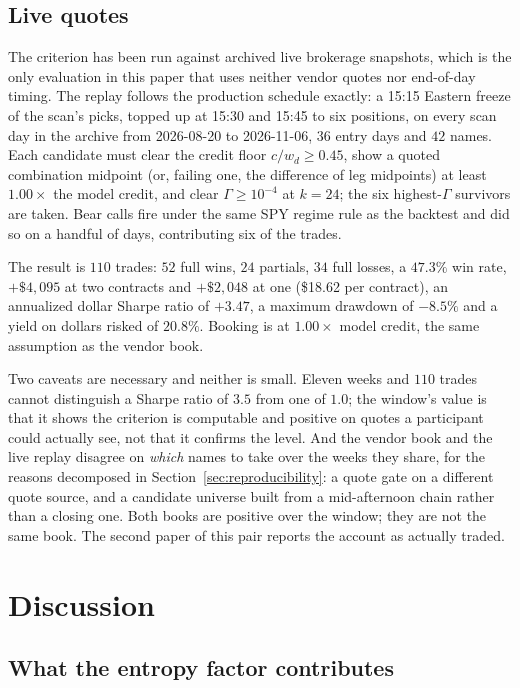 \documentclass[11pt]{article}
\begin{document}
\subsection{Live quotes}
\label{sec:live}

The criterion has been run against archived live brokerage snapshots, which is
the only evaluation in this paper that uses neither vendor quotes nor
end-of-day timing. The replay follows the production schedule exactly: a
15:15 Eastern freeze of the scan's picks, topped up at 15:30 and 15:45 to six
positions, on every scan day in the archive from 2026-08-20 to 2026-11-06,
$36$ entry days and $42$ names. Each candidate must clear the credit floor
$c/w_d \geq 0.45$, show a quoted combination midpoint (or, failing one, the
difference of leg midpoints) at least $1.00\times$ the model credit, and clear
$\Gamma \geq 10^{-4}$ at $k = 24$; the six highest-$\Gamma$ survivors are
taken. Bear calls fire under the same SPY regime rule as the backtest and did
so on a handful of days, contributing six of the trades.

The result is $110$ trades: $52$ full wins, $24$ partials, $34$ full losses,
a $47.3\%$ win rate, $+\$4{,}095$ at two contracts and $+\$2{,}048$ at one
(\$18.62 per contract), an annualized dollar Sharpe ratio of $+3.47$, a
maximum drawdown of $-8.5\%$ and a yield on dollars risked of $20.8\%$.
Booking is at $1.00\times$ model credit, the same assumption as the vendor
book.

Two caveats are necessary and neither is small. Eleven weeks and $110$ trades
cannot distinguish a Sharpe ratio of $3.5$ from one of $1.0$; the window's
value is that it shows the criterion is computable and positive on quotes a
participant could actually see, not that it confirms the level. And the vendor
book and the live replay disagree on \emph{which} names to take over the
weeks they share, for the reasons decomposed in
Section~\ref{sec:reproducibility}: a quote gate on a different quote source,
and a candidate universe built from a mid-afternoon chain rather than a closing
one. Both books are positive over the window; they are not the same book. The
second paper of this pair reports the account as actually traded.

\section{Discussion}
\label{sec:discussion}

\subsection{What the entropy factor contributes}
\end{document}
